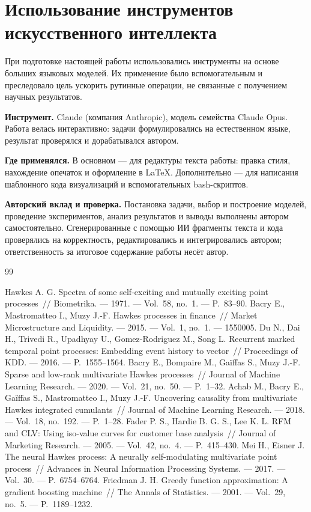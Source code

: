\documentclass[12pt,a4paper]{article}
\begin{document}
\clearpage
\section{Использование инструментов искусственного интеллекта}

При подготовке настоящей работы использовались инструменты на основе больших языковых моделей. Их применение было вспомогательным и преследовало цель ускорить рутинные операции, не связанные с получением научных результатов.

\textbf{Инструмент.} Claude (компания Anthropic), модель семейства Claude Opus. Работа велась интерактивно: задачи формулировались на естественном языке, результат проверялся и дорабатывался автором.

\textbf{Где применялся.} В основном --- для редактуры текста работы: правка стиля, нахождение опечаток и оформление в \LaTeX. Дополнительно --- для написания шаблонного кода визуализаций и вспомогательных bash-скриптов.

\textbf{Авторский вклад и проверка.} Постановка задачи, выбор и построение моделей, проведение экспериментов, анализ результатов и выводы выполнены автором самостоятельно. Сгенерированные с помощью ИИ фрагменты текста и кода проверялись на корректность, редактировались и интегрировались автором; ответственность за итоговое содержание работы несёт автор.

\begin{thebibliography}{99}

 Hawkes A. G. Spectra of some self-exciting and mutually exciting point processes~// Biometrika. --- 1971. --- Vol.~58, no.~1. --- P.~83--90.
 Bacry E., Mastromatteo I., Muzy J.-F. Hawkes processes in finance~// Market Microstructure and Liquidity. --- 2015. --- Vol.~1, no.~1. --- 1550005.
 Du N., Dai H., Trivedi R., Upadhyay U., Gomez-Rodriguez M., Song L. Recurrent marked temporal point processes: Embedding event history to vector~// Proceedings of KDD. --- 2016. --- P.~1555--1564.
 Bacry E., Bompaire M., Gaïffas S., Muzy J.-F. Sparse and low-rank multivariate Hawkes processes~// Journal of Machine Learning Research. --- 2020. --- Vol.~21, no.~50. --- P.~1--32.
 Achab M., Bacry E., Gaïffas S., Mastromatteo I., Muzy J.-F. Uncovering causality from multivariate Hawkes integrated cumulants~// Journal of Machine Learning Research. --- 2018. --- Vol.~18, no.~192. --- P.~1--28.
 Fader P. S., Hardie B. G. S., Lee K. L. RFM and CLV: Using iso-value curves for customer base analysis~// Journal of Marketing Research. --- 2005. --- Vol.~42, no.~4. --- P.~415--430.
 Mei H., Eisner J. The neural Hawkes process: A neurally self-modulating multivariate point process~// Advances in Neural Information Processing Systems. --- 2017. --- Vol.~30. --- P.~6754--6764.
 Friedman J. H. Greedy function approximation: A gradient boosting machine~// The Annals of Statistics. --- 2001. --- Vol.~29, no.~5. --- P.~1189--1232.

\end{thebibliography}
\end{document}
